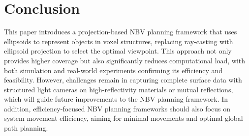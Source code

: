 \documentclass[letterpaper, 10 pt, conference]{ieeeconf}  %
\begin{document}






\section{Conclusion}

This paper introduces a projection-based NBV planning framework that uses ellipsoids to represent objects in voxel structures, replacing ray-casting with ellipsoid projection to select the optimal viewpoint. This approach not only provides higher coverage but also significantly reduces computational load, with both simulation and real-world experiments confirming its efficiency and feasibility.
However, challenges remain in capturing complete surface data with structured light cameras on high-reflectivity materials or mutual reflections, which will guide future improvements to the NBV planning framework. 
In addition, efficiency-focused NBV planning frameworks should also focus on system movement efficiency, aiming for minimal movements and optimal global path planning.

\addtolength{\textheight}{0.cm}   %


\end{document}

